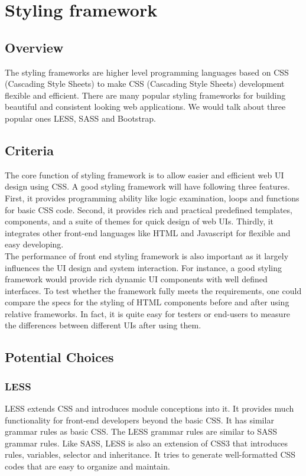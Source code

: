 \documentclass[letterpaper,10pt]{article}
\begin{document}
\section{Styling framework}
	\subsection{Overview}
  The styling frameworks are higher level programming languages based on CSS (Cascading Style Sheets) to make CSS (Cascading Style Sheets) development flexible and efficient. There are many popular styling frameworks for building beautiful and consistent looking web applications. We would talk about three popular ones LESS, SASS and Bootstrap.

	\subsection{Criteria}
  The core function of styling framework is to allow easier and efficient web UI design using CSS. A good styling framework will have following three features. First, it provides programming ability like logic examination, loops and functions for basic CSS code. Second, it provides rich and practical predefined templates, components, and a suite of themes for quick design of web UIs. Thirdly, it integrates other front-end languages like HTML and Javascript for flexible and easy developing.\\
  The performance of front end styling framework is also important as it largely influences the UI design and system interaction. For instance, a good styling framework would provide rich dynamic UI components with well defined interfaces. To test whether the framework fully meets the requirements, one could compare the specs for the styling of HTML components before and after using relative frameworks. In fact, it is quite easy for testers or end-users to measure the differences between different UIs after using them.\\

	\subsection{Potential Choices}
		\subsubsection{LESS}
        LESS extends CSS and introduces module conceptions into it. It provides much functionality for front-end developers beyond the basic CSS. It has similar grammar rules as basic CSS. The LESS grammar rules are similar to SASS grammar rules. Like SASS, LESS is also an extension of CSS3 that introduces rules, variables, selector and inheritance. It tries to generate well-formatted CSS codes that are easy to organize and maintain.
\end{document}
